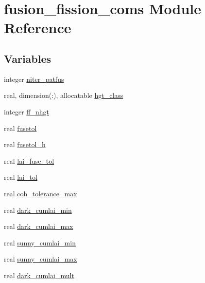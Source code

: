 \hypertarget{namespacefusion__fission__coms}{}\section{fusion\+\_\+fission\+\_\+coms Module Reference}
\label{namespacefusion__fission__coms}
\subsection*{Variables}
\begin{DoxyCompactItemize}
\item 
integer \hyperlink{namespacefusion__fission__coms_a08e50e0002f567a0ba2065dcec007a5d}{niter\+\_\+patfus}
\item 
real, dimension(\+:), allocatable \hyperlink{namespacefusion__fission__coms_ae764a0782d428f619f8699436f781b6a}{hgt\+\_\+class}
\item 
integer \hyperlink{namespacefusion__fission__coms_a70870869c112cab58081fe3db61c9dc7}{ff\+\_\+nhgt}
\item 
real \hyperlink{namespacefusion__fission__coms_ab21fc53bfafeb048e8f02a26cd204b02}{fusetol}
\item 
real \hyperlink{namespacefusion__fission__coms_a19463812b3be234c086b50080c6431cf}{fusetol\+\_\+h}
\item 
real \hyperlink{namespacefusion__fission__coms_ab1cef63eced987708359ace3d7c8405d}{lai\+\_\+fuse\+\_\+tol}
\item 
real \hyperlink{namespacefusion__fission__coms_ad01836d622d3d9ece106127c598eb0d5}{lai\+\_\+tol}
\item 
real \hyperlink{namespacefusion__fission__coms_a26b067f4070a314e0e5d2c52088aa6d9}{coh\+\_\+tolerance\+\_\+max}
\item 
real \hyperlink{namespacefusion__fission__coms_a8f814b477d6953f5b8f16e71d0014d64}{dark\+\_\+cumlai\+\_\+min}
\item 
real \hyperlink{namespacefusion__fission__coms_a750dd18910894531bd08cc5449849759}{dark\+\_\+cumlai\+\_\+max}
\item 
real \hyperlink{namespacefusion__fission__coms_af9d1927c4edb9281fb1ee94b3cf43820}{sunny\+\_\+cumlai\+\_\+min}
\item 
real \hyperlink{namespacefusion__fission__coms_a9eadfcde9b06a4ed1c36ffa027a98c80}{sunny\+\_\+cumlai\+\_\+max}
\item 
real \hyperlink{namespacefusion__fission__coms_a858c59d63500c90bf2d5aa0d9304597f}{dark\+\_\+cumlai\+\_\+mult}

\end{DoxyCompactItemize}
